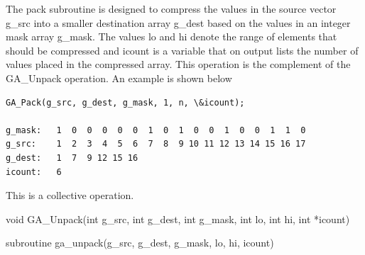 \documentclass[12pt]{article}
\begin{document}
\begin{desc}

The pack subroutine is designed to compress the values in the source vector g_src into a smaller destination array g_dest based on the values in an integer mask array g_mask. The values lo and hi denote the range of elements that should be compressed and icount is a variable that on output lists the number of values placed in the compressed array. This operation is the complement of the GA_Unpack operation. An example is shown below

\begin{verbatim}
GA_Pack(g_src, g_dest, g_mask, 1, n, \&icount);

g_mask:   1  0  0  0  0  0  1  0  1  0  0  1  0  0  1  1  0
g_src:    1  2  3  4  5  6  7  8  9 10 11 12 13 14 15 16 17
g_dest:   1  7  9 12 15 16
icount:   6
\end{verbatim}

This is a collective operation.
\end{desc}


\begin{capi}
\begin{ccode}
void GA_Unpack(int g_src, int g_dest, int g_mask, int lo, int hi, 
               int *icount)
\end{ccode}
\begin{funcargs}
\end{funcargs}
\end{capi}

\begin{fapi}
\begin{fcode}
subroutine ga_unpack(g_src, g_dest, g_mask, lo, hi, icount)
\end{fcode}
\begin{funcargs}
\end{funcargs}
\end{fapi}
\end{document}

